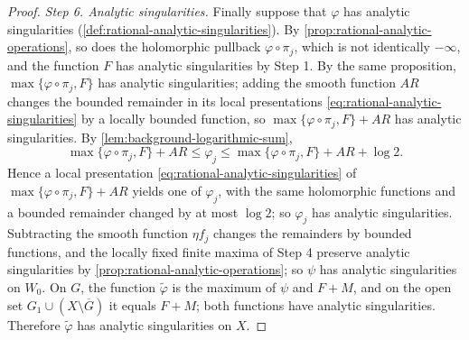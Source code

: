 \begin{proof}
\emph{Step 6. Analytic singularities.} Finally suppose that $\varphi$ has analytic singularities (\cref{def:rational-analytic-singularities}). By \cref{prop:rational-analytic-operations}, so does the holomorphic pullback $\varphi\circ\pi_j$, which is not identically $-\infty$, and the function $F$ has analytic singularities by Step 1. By the same proposition, $\max\{\varphi\circ\pi_j,F\}$ has analytic singularities; adding the smooth function $AR$ changes the bounded remainder in its local presentations \eqref{eq:rational-analytic-singularities} by a locally bounded function, so $\max\{\varphi\circ\pi_j,F\}+AR$ has analytic singularities. By \cref{lem:background-logarithmic-sum},
\[
 \max\{\varphi\circ\pi_j,F\}+AR\leq\varphi_j\leq\max\{\varphi\circ\pi_j,F\}+AR+\log2.
\]
Hence a local presentation \eqref{eq:rational-analytic-singularities} of $\max\{\varphi\circ\pi_j,F\}+AR$ yields one of $\varphi_j$, with the same holomorphic functions and a bounded remainder changed by at most $\log2$; so $\varphi_j$ has analytic singularities. Subtracting the smooth function $\eta f_j$ changes the remainders by bounded functions, and the locally fixed finite maxima of Step 4 preserve analytic singularities by \cref{prop:rational-analytic-operations}; so $\psi$ has analytic singularities on $W_0$. On $G$, the function $\widetilde\varphi$ is the maximum of $\psi$ and $F+M$, and on the open set $G_1\cup(X\setminus\overline G)$ it equals $F+M$; both functions have analytic singularities. Therefore $\widetilde\varphi$ has analytic singularities on $X$.
\end{proof}
